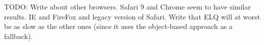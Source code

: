 \documentclass{acm_proc_article-sp}
\newcommand{\elq}{ELQ}
\begin{document}
    TODO: Write about other browsers. Safari 9 and Chrome seem to have similar results. IE and FireFox and legacy version of Safari. Write that \elq{} will at worst be as slow as the other ones (since it uses the object-based approach as a fallback).


\end{document}

